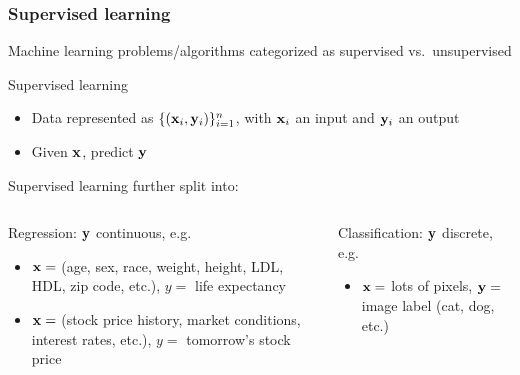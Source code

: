 \begin{frame}
    \frametitle{Supervised learning}
    Machine learning problems/algorithms categorized as \alert{supervised} vs.~\alert{unsupervised}

    \begin{block}{Supervised learning}
        \begin{itemize}
            \item Data represented as $\{(\mathbf{x}_i, \mathbf{y}_i)\}_{i=1}^n$, with $\mathbf{x}_i$ an input and $\mathbf{y}_i$ an output
            \item Given $\mathbf{x}$, predict $\mathbf{y}$
        \end{itemize}
    \end{block}
    \pause

    Supervised learning further split into: \\[1ex]
    \begin{columns}[t]
        \begin{column}{0.47\textwidth}
            \alert{Regression}: $\mathbf{y}$ continuous, e.g.
            \begin{itemize}
                \item $\mathbf{x} =$ (age, sex, race, weight, height, LDL, HDL, zip code, etc.), $y =$ life expectancy
                \item $\mathbf{x} =$ (stock price history, market conditions, interest rates, etc.), $y =$ tomorrow's stock price
            \end{itemize}
        \end{column}
        \pause
        \begin{column}{0.45\textwidth}
            \alert{Classification}: $\mathbf{y}$ discrete, e.g.
            \begin{itemize}
                \item $\mathbf{x} =$ lots of pixels, $\mathbf{y} =$ image label (cat, dog, etc.)
            \end{itemize}
        \end{column}
    \end{columns}
\end{frame}

